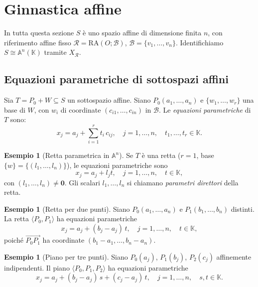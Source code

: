 \documentclass[11pt, a4paper]{book}
\theoremstyle{definition}
\newtheorem{esempio}[definizione]{Esempio}
\theoremstyle{plain}
\theoremstyle{remark}
\newcommand{\K}{\mathbb{K}}
\newcommand{\RA}{\mathrm{RA}}   %
\begin{document}
\section{Ginnastica affine}
\label{sec:ginnastica-affine}

In tutta questa sezione $S$ è uno spazio affine di dimensione finita $n$, con riferimento affine fisso $\mathcal{R} = \RA(O;\mathcal{B})$, $\mathcal{B} = \{v_1, \ldots, v_n\}$. Identifichiamo $S \cong \mathbb{A}^n(\K)$ tramite $X_\mathcal{R}$.

\subsection{Equazioni parametriche di sottospazi affini}

Sia $T = P_0 + W \subseteq S$ un sottospazio affine. Siano $P_0(a_1,\ldots,a_n)$ e $\{w_1, \ldots, w_r\}$ una base di $W$, con $w_i$ di coordinate $(c_{i1},\ldots,c_{in})$ in $\mathcal{B}$. Le \emph{equazioni parametriche} di $T$ sono:
\[
  x_j = a_j + \sum_{i=1}^r t_i\, c_{ij}, \quad j = 1,\ldots,n, \quad t_1,\ldots,t_r \in \K.
\]

\begin{exbox}
\begin{esempio}[Retta parametrica in $\mathbb{A}^n$]
\label{es:retta-param}
Se $T$ è una retta ($r = 1$, base $\{w\} = \{(l_1,\ldots,l_n)\}$), le equazioni parametriche sono
\[
  x_j = a_j + l_j t, \quad j = 1,\ldots,n, \quad t \in \K,
\]
con $(l_1,\ldots,l_n) \neq \mathbf{0}$. Gli scalari $l_1,\ldots,l_n$ si chiamano \emph{parametri direttori} della retta.
\end{esempio}
\end{exbox}

\begin{exbox}
\begin{esempio}[Retta per due punti]
Siano $P_0(a_1,\ldots,a_n)$ e $P_1(b_1,\ldots,b_n)$ distinti. La retta $\langle P_0, P_1 \rangle$ ha equazioni parametriche
\[
  x_j = a_j + (b_j - a_j)\,t, \quad j = 1,\ldots,n, \quad t \in \K,
\]
poiché $\overrightarrow{P_0P_1}$ ha coordinate $(b_1 - a_1, \ldots, b_n - a_n)$.
\end{esempio}
\end{exbox}

\begin{exbox}
\begin{esempio}[Piano per tre punti]
Siano $P_0(a_j)$, $P_1(b_j)$, $P_2(c_j)$ affinemente indipendenti. Il piano $\langle P_0,P_1,P_2 \rangle$ ha equazioni parametriche
\[
  x_j = a_j + (b_j - a_j)\,s + (c_j - a_j)\,t, \quad j = 1,\ldots,n, \quad s, t \in \K.
\]
\end{esempio}
\end{exbox}
\end{document}
